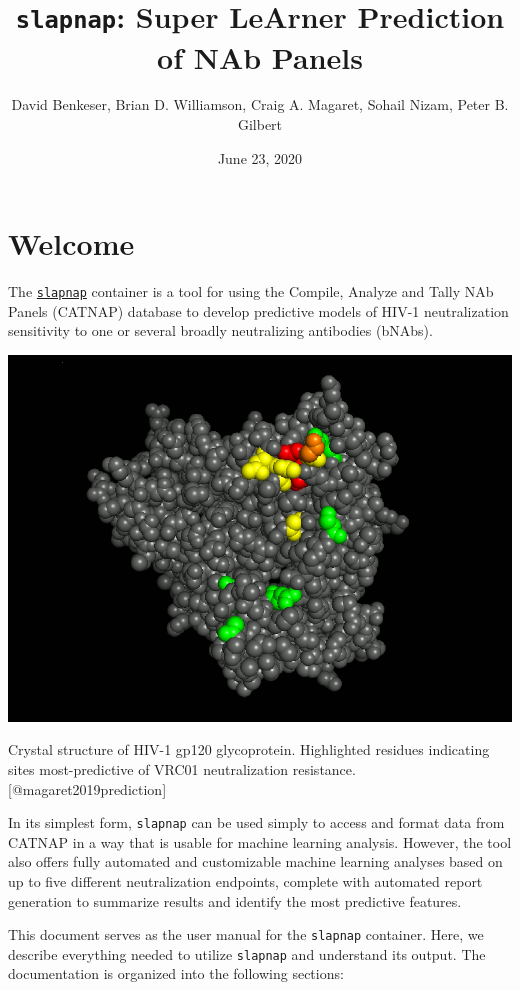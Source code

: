 \documentclass[]{article}
\title{\texttt{slapnap}: Super LeArner Prediction of NAb Panels}
\author{David Benkeser, Brian D. Williamson, Craig A. Magaret, Sohail Nizam,
Peter B. Gilbert}
\date{June 23, 2020}
\begin{document}
\maketitle

{
\setcounter{tocdepth}{2}
\tableofcontents
}
\section*{Welcome}\label{welcome}

The \href{https://hub.docker.com/r/slapnap/slapnap}{\texttt{slapnap}}
container is a tool for using the Compile, Analyze and Tally NAb Panels
(CATNAP) database to develop predictive models of HIV-1 neutralization
sensitivity to one or several broadly neutralizing antibodies (bNAbs).

\begin{center}\includegraphics[width=0.7\linewidth]{gp120} \end{center}\begin{center}
Crystal structure of HIV-1 gp120 glycoprotein. Highlighted residues
indicating sites most-predictive of VRC01 neutralization resistance.
{[}@magaret2019prediction{]}
\end{center}

In its simplest form, \texttt{slapnap} can be used simply to access and
format data from CATNAP in a way that is usable for machine learning
analysis. However, the tool also offers fully automated and customizable
machine learning analyses based on up to five different neutralization
endpoints, complete with automated report generation to summarize
results and identify the most predictive features.

This document serves as the user manual for the \texttt{slapnap}
container. Here, we describe everything needed to utilize
\texttt{slapnap} and understand its output. The documentation is
organized into the following sections:
\end{document}
